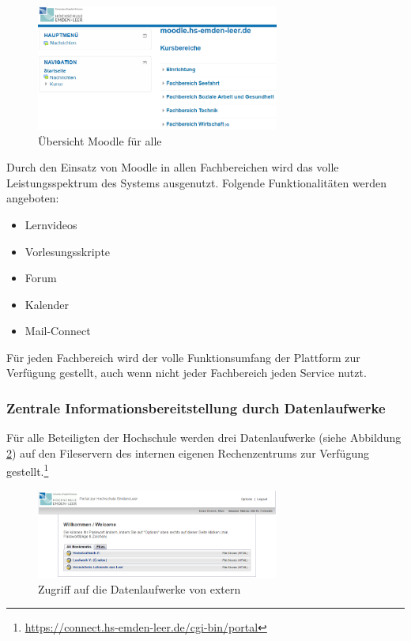 \begin{figure}[h!]
	\centering
	\includegraphics[width=8cm]{kapitel/gruppe2/bilder/moodle}
	\caption{Übersicht Moodle für alle}
	\label{fig_moodle}
\end{figure}

Durch den Einsatz von Moodle in allen Fachbereichen wird das volle Leistungsspektrum des Systems ausgenutzt. Folgende Funktionalitäten werden angeboten:
\begin{itemize}
	\item Lernvideos
	\item Vorlesungsskripte
	\item Forum
	\item Kalender
	\item Mail-Connect
\end{itemize}

Für jeden Fachbereich wird der volle Funktionsumfang der Plattform zur Verfügung gestellt, auch wenn nicht jeder Fachbereich jeden Service nutzt. 

\subsubsection{Zentrale Informationsbereitstellung durch Datenlaufwerke}
Für alle Beteiligten der Hochschule werden drei Datenlaufwerke (siehe Abbildung \ref{fig_zugriff_datenlaufwerke_extern}) auf den Fileservern des internen eigenen Rechenzentrums zur Verfügung gestellt.\footnote{\url{https://connect.hs-emden-leer.de/cgi-bin/portal}}

\begin{figure}[h!]
	\centering
	\includegraphics[width=8cm]{kapitel/gruppe2/bilder/zugriff_auf_laufwerke_extern}
	\caption{Zugriff auf die Datenlaufwerke von extern}
	\label{fig_zugriff_datenlaufwerke_extern}
\end{figure}


